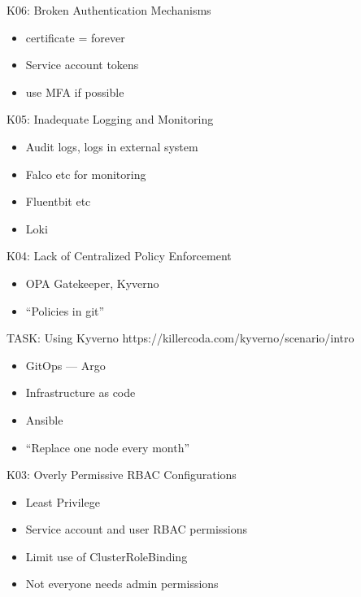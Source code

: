 \documentclass{dcpresentation}
\begin{document}
\begin{frame}{K06: Broken Authentication Mechanisms}
  \begin{itemize}
  \item certificate = forever
  \item Service account tokens
  \item use MFA if possible
  \end{itemize}
\end{frame}


\begin{frame}{K05: Inadequate Logging and Monitoring}
  \begin{itemize}
  \item Audit logs, logs in external system
  \item Falco etc for monitoring
  \item Fluentbit etc
  \item Loki
  \end{itemize}
\end{frame}

\begin{frame}{K04: Lack of Centralized Policy Enforcement}
  \begin{itemize}
  \item OPA Gatekeeper, Kyverno
  \item ``Policies in git''
  \end{itemize}
\end{frame}

\begin{frame}{TASK: Using Kyverno}
 https://killercoda.com/kyverno/scenario/intro
\end{frame}

\begin{frame}
  \begin{itemize}
  \item GitOps --- Argo
  \item Infrastructure as code
  \item Ansible
  \item ``Replace one node every month''
  \end{itemize}
\end{frame}


\begin{frame}{K03: Overly Permissive RBAC Configurations}
  \begin{itemize}
  \item Least Privilege
  \item Service account and user RBAC permissions
  \item Limit use of ClusterRoleBinding
  \item Not everyone needs admin permissions
  \end{itemize}
\end{frame}
\end{document}
